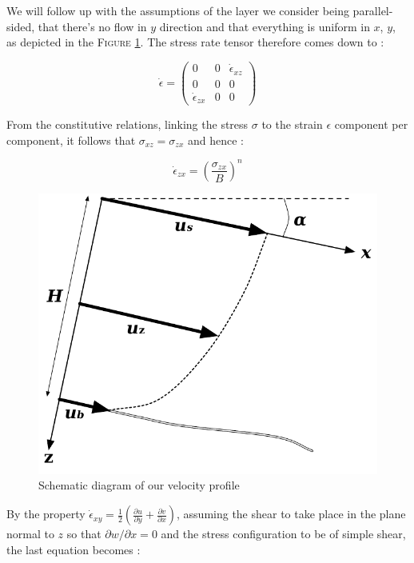 \documentclass[11pt]{report}
\begin{document}
We will follow up with the assumptions of the layer we consider being parallel-sided, that there's no flow in $y$ direction and that everything is uniform in $x$, $y$, as depicted in the \textsc{Figure} \ref{velocities}. The stress rate tensor therefore comes down to :


\[ \dot{\epsilon} = \left( \begin{array}{ccc}
0 & 0 & \dot{\epsilon}_{xz} \\
0 & 0 & 0 \\
\dot{\epsilon}_{zx} & 0 & 0
\end{array} \right) \]

From the constitutive relations, linking the stress $\sigma$ to the strain $\epsilon$ component per component, it follows that $\sigma_{xz} = \sigma_{zx}$ and hence :

\[\dot{\epsilon}_{zx} = \left( \frac{\sigma_{zx}}{B} \right)^n\]


\begin{figure}
	\begin{center}
		\includegraphics[scale=0.7]{VelocityProfile}
		\caption{Schematic diagram of our velocity profile}
		\label{velocities}
	\end{center}
\end{figure}

By the property $\dot{\epsilon}_{xy} = \frac{1}{2} \left( \frac{\partial u}{\partial y} + \frac{\partial v}{\partial x}\right)$, assuming the shear to take place in the plane normal to $z$ so that $\partial w / \partial x = 0$ and the stress configuration to be of simple shear, the last equation becomes :
\end{document}
